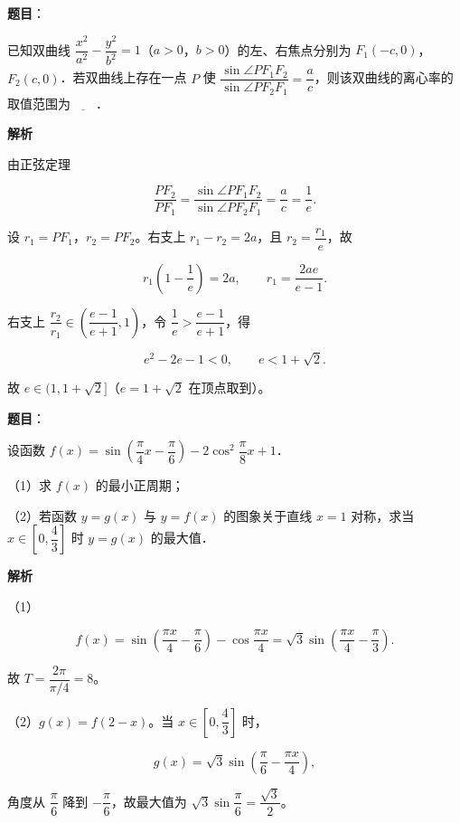 \begin{answer}

\textbf{题目}：

已知双曲线 $\dfrac{x^2}{a^2}-\dfrac{y^2}{b^2}=1$（$a>0$，$b>0$）的左、右焦点分别为 $F_1(-c,0)$，$F_2(c,0)$．若双曲线上存在一点 $P$ 使 $\dfrac{\sin\angle PF_1F_2}{\sin\angle PF_2F_1}=\dfrac ac$，则该双曲线的离心率的取值范围为$\underline{\qquad}$．

\textbf{解析}

由正弦定理

\nopagebreak[4]
\[\frac{PF_2}{PF_1}=\frac{\sin\angle PF_1F_2}{\sin\angle PF_2F_1}=\frac ac=\frac1e.\]

设 $r_1=PF_1$，$r_2=PF_2$。右支上 $r_1-r_2=2a$，且 $r_2=\dfrac{r_1}e$，故

\nopagebreak[4]
\[r_1\left(1-\frac1e\right)=2a,\qquad r_1=\frac{2ae}{e-1}.\]

右支上 $\dfrac{r_2}{r_1}\in\left(\dfrac{e-1}{e+1},1\right)$，令 $\dfrac1e>\dfrac{e-1}{e+1}$，得

\nopagebreak[4]
\[e^2-2e-1<0,\qquad e<1+\sqrt2.\]

故 $e\in(1,1+\sqrt2]$（$e=1+\sqrt2$ 在顶点取到）。

\gkanswer{答案：$(1,1+\sqrt2]$。}

\end{answer}
\begin{answer}

\textbf{题目}：

设函数 $f(x)=\sin\left(\dfrac\pi4x-\dfrac\pi6\right)-2\cos^2\dfrac\pi8x+1$．

（1）求 $f(x)$ 的最小正周期；

（2）若函数 $y=g(x)$ 与 $y=f(x)$ 的图象关于直线 $x=1$ 对称，求当 $x\in\left[0,\dfrac43\right]$ 时 $y=g(x)$ 的最大值．

\textbf{解析}

（1）

\nopagebreak[4]
\[f(x)=\sin\left(\frac{\pi x}4-\frac\pi6\right)-\cos\frac{\pi x}4
=\sqrt3\sin\left(\frac{\pi x}4-\frac\pi3\right).\]

故 $T=\dfrac{2\pi}{\pi/4}=8$。

（2）$g(x)=f(2-x)$。当 $x\in\left[0,\dfrac43\right]$ 时，

\nopagebreak[4]
\[g(x)=\sqrt3\sin\left(\frac\pi6-\frac{\pi x}4\right),\]

角度从 $\dfrac\pi6$ 降到 $-\dfrac\pi6$，故最大值为 $\sqrt3\sin\dfrac\pi6=\dfrac{\sqrt3}2$。


\end{answer}

